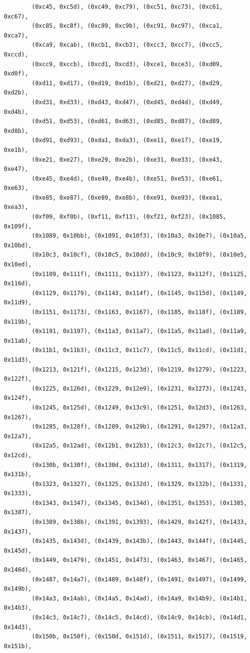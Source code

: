 \documentclass[11pt,a4paper]{article}
\begin{document}
\begin{lstlisting}
        (0xc45, 0xc5d), (0xc49, 0xc79), (0xc51, 0xc73), (0xc61, 0xc67),
        (0xc85, 0xc8f), (0xc89, 0xc9b), (0xc91, 0xc97), (0xca1, 0xca7),
        (0xca9, 0xcab), (0xcb1, 0xcb3), (0xcc3, 0xcc7), (0xcc5, 0xccd),
        (0xcc9, 0xccb), (0xcd1, 0xcd3), (0xce1, 0xce3), (0xd09, 0xd0f),
        (0xd11, 0xd17), (0xd19, 0xd1b), (0xd21, 0xd27), (0xd29, 0xd2b),
        (0xd31, 0xd33), (0xd43, 0xd47), (0xd45, 0xd4d), (0xd49, 0xd4b),
        (0xd51, 0xd53), (0xd61, 0xd63), (0xd85, 0xd87), (0xd89, 0xd8b),
        (0xd91, 0xd93), (0xda1, 0xda3), (0xe11, 0xe17), (0xe19, 0xe1b),
        (0xe21, 0xe27), (0xe29, 0xe2b), (0xe31, 0xe33), (0xe43, 0xe47),
        (0xe45, 0xe4d), (0xe49, 0xe4b), (0xe51, 0xe53), (0xe61, 0xe63),
        (0xe85, 0xe87), (0xe89, 0xe8b), (0xe91, 0xe93), (0xea1, 0xea3),
        (0xf09, 0xf0b), (0xf11, 0xf13), (0xf21, 0xf23), (0x1085, 0x109f),
        (0x1089, 0x10bb), (0x1091, 0x10f3), (0x10a3, 0x10e7), (0x10a5, 0x10bd),
        (0x10c3, 0x10cf), (0x10c5, 0x10dd), (0x10c9, 0x10f9), (0x10e5, 0x10ed),
        (0x1109, 0x111f), (0x1111, 0x1137), (0x1123, 0x112f), (0x1125, 0x116d),
        (0x1129, 0x1179), (0x1143, 0x114f), (0x1145, 0x115d), (0x1149, 0x11d9),
        (0x1151, 0x1173), (0x1163, 0x1167), (0x1185, 0x118f), (0x1189, 0x119b),
        (0x1191, 0x1197), (0x11a3, 0x11a7), (0x11a5, 0x11ad), (0x11a9, 0x11ab),
        (0x11b1, 0x11b3), (0x11c3, 0x11c7), (0x11c5, 0x11cd), (0x11d1, 0x11d3),
        (0x1213, 0x121f), (0x1215, 0x123d), (0x1219, 0x1279), (0x1223, 0x122f),
        (0x1225, 0x126d), (0x1229, 0x12e9), (0x1231, 0x1273), (0x1243, 0x124f),
        (0x1245, 0x125d), (0x1249, 0x13c9), (0x1251, 0x12d3), (0x1263, 0x1267),
        (0x1285, 0x128f), (0x1289, 0x129b), (0x1291, 0x1297), (0x12a3, 0x12a7),
        (0x12a5, 0x12ad), (0x12b1, 0x12b3), (0x12c3, 0x12c7), (0x12c5, 0x12cd),
        (0x130b, 0x130f), (0x130d, 0x131d), (0x1311, 0x1317), (0x1319, 0x131b),
        (0x1323, 0x1327), (0x1325, 0x132d), (0x1329, 0x132b), (0x1331, 0x1333),
        (0x1343, 0x1347), (0x1345, 0x134d), (0x1351, 0x1353), (0x1385, 0x1387),
        (0x1389, 0x138b), (0x1391, 0x1393), (0x1429, 0x142f), (0x1433, 0x1437),
        (0x1435, 0x143d), (0x1439, 0x143b), (0x1443, 0x144f), (0x1445, 0x145d),
        (0x1449, 0x1479), (0x1451, 0x1473), (0x1463, 0x1467), (0x1465, 0x146d),
        (0x1487, 0x14a7), (0x1489, 0x148f), (0x1491, 0x1497), (0x1499, 0x149b),
        (0x14a3, 0x14ab), (0x14a5, 0x14ad), (0x14a9, 0x14b9), (0x14b1, 0x14b3),
        (0x14c3, 0x14c7), (0x14c5, 0x14cd), (0x14c9, 0x14cb), (0x14d1, 0x14d3),
        (0x150b, 0x150f), (0x150d, 0x151d), (0x1511, 0x1517), (0x1519, 0x151b),

\end{lstlisting}
\end{document}
